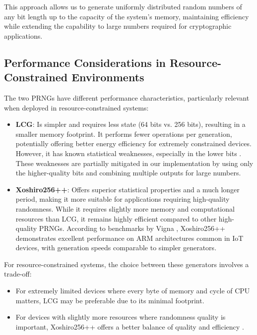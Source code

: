 This approach allows us to generate uniformly distributed random numbers of any bit length up to the capacity of the system's memory, maintaining efficiency while extending the capability to large numbers required for cryptographic applications.

\subsection{Performance Considerations in Resource-Constrained Environments}

The two PRNGs have different performance characteristics, particularly relevant when deployed in resource-constrained systems:

\begin{itemize}
    \item \textbf{LCG}: Is simpler and requires less state (64 bits vs. 256 bits), resulting in a smaller memory footprint. It performs fewer operations per generation, potentially offering better energy efficiency for extremely constrained devices. However, it has known statistical weaknesses, especially in the lower bits \cite{knuth1997}. These weaknesses are partially mitigated in our implementation by using only the higher-quality bits and combining multiple outputs for large numbers.
    
    \item \textbf{Xoshiro256++}: Offers superior statistical properties and a much longer period, making it more suitable for applications requiring high-quality randomness. While it requires slightly more memory and computational resources than LCG, it remains highly efficient compared to other high-quality PRNGs. According to benchmarks by Vigna \cite{xoshiro_website}, Xoshiro256++ demonstrates excellent performance on ARM architectures common in IoT devices, with generation speeds comparable to simpler generators.
\end{itemize}

For resource-constrained systems, the choice between these generators involves a trade-off:

\begin{itemize}
    \item For extremely limited devices where every byte of memory and cycle of CPU matters, LCG may be preferable due to its minimal footprint.
    
    \item For devices with slightly more resources where randomness quality is important, Xoshiro256++ offers a better balance of quality and efficiency \cite{prng_iot}.
\end{itemize}

